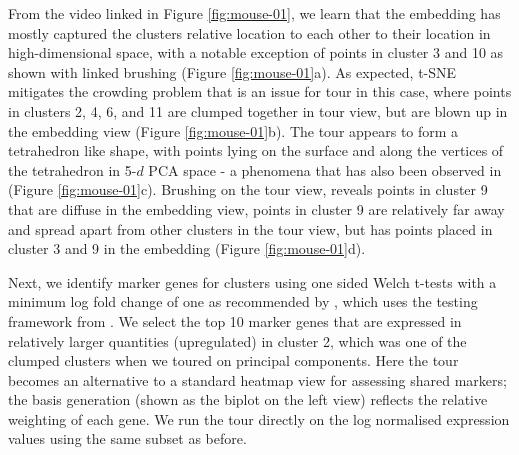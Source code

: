 \documentclass[article,notitle]{jdssv}
\begin{document}
From the video linked in Figure \ref{fig:mouse-01}, we learn that the embedding has mostly captured the
clusters relative location to each other to their location in high-dimensional space, with a notable exception of points in cluster 3 and 10 as shown with
linked brushing (Figure \ref{fig:mouse-01}a). As expected, t-SNE mitigates the crowding problem that is
an issue for tour in this case, where points in clusters 2, 4, 6, and 11 are
clumped together in tour view, but are blown up in the embedding view (Figure \ref{fig:mouse-01}b).
The tour appears to form a tetrahedron like shape, with points lying on
the surface and along the vertices of the tetrahedron in 5-\(d\) PCA space -
a phenomena that has also been observed in \citet{Korem2015-af}
(Figure \ref{fig:mouse-01}c). Brushing on
the tour view, reveals points in cluster 9 that are diffuse in the embedding
view, points in cluster 9 are relatively far away and spread apart from other
clusters in the tour view, but has points placed in cluster 3 and 9 in the embedding
(Figure \ref{fig:mouse-01}d).

Next, we identify marker genes for clusters using one sided Welch t-tests with
a minimum log fold change of one as recommended by \citet{Amezquita2020-at}, which
uses the testing framework from \citet{McCarthy2009-qx}. We select the top 10 marker
genes that are expressed in relatively larger quantities (upregulated) in cluster 2, which was one of the clumped clusters
when we toured on principal components. Here the tour becomes an alternative
to a standard heatmap view for assessing shared markers; the basis
generation (shown as the biplot on the left view) reflects the relative
weighting of each gene. We run the tour directly on the
log normalised expression values using the same subset as before.
\end{document}
